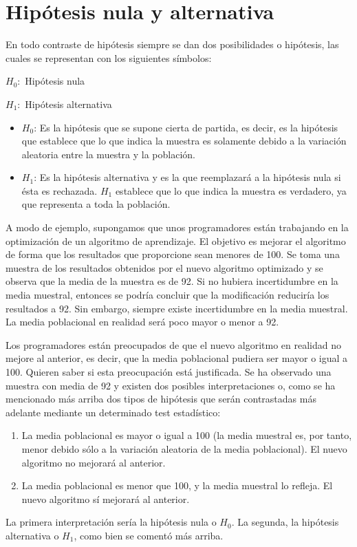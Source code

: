
\section{Hipótesis nula y alternativa}
En todo contraste de hipótesis siempre se dan dos posibilidades o hipótesis, las cuales se representan con
los siguientes símbolos:
\begin{center}
$H_0:$ Hipótesis nula

$H_1:$ Hipótesis alternativa
\end{center}
\begin{itemize}
\item $H_0$: Es la hipótesis que se supone cierta de partida, es decir, es la hipótesis que establece que lo que
indica la muestra es solamente debido a la variación aleatoria entre la muestra y la población.
\item $H_1$: Es la hipótesis alternativa y es la que reemplazará a la hipótesis nula si ésta es rechazada. $H_1$
establece que lo que indica la muestra es verdadero, ya que representa a toda la población.
\end{itemize}
A modo de ejemplo, supongamos que unos programadores están trabajando en la optimización de un algoritmo
de aprendizaje. El objetivo es mejorar el algoritmo de forma que los resultados que proporcione sean menores
de 100. Se toma una muestra de los resultados obtenidos por el nuevo algoritmo optimizado y se observa que la
media de la muestra es de 92. Si no hubiera incertidumbre en la media muestral, entonces se podría concluir
que la modificación reduciría los resultados a 92. Sin embargo, siempre existe incertidumbre en la media
muestral. La media poblacional en realidad será poco mayor o menor a 92.

Los programadores están preocupados de que el nuevo algoritmo en realidad no mejore al anterior, es decir, que
la media poblacional pudiera ser mayor o igual a 100. Quieren saber si esta preocupación está justificada. Se ha
observado una muestra con media de 92 y existen dos posibles interpretaciones o, como se ha mencionado más arriba
dos tipos de hipótesis que serán contrastadas más adelante mediante un determinado test estadístico:
\begin{enumerate}
\item La media poblacional es mayor o igual a 100 (la media muestral es, por tanto, menor debido sólo a la
variación aleatoria de la media poblacional). El nuevo algoritmo no mejorará al anterior.
\item La media poblacional es menor que 100, y la media muestral lo refleja. El nuevo algoritmo sí mejorará
al anterior.
\end{enumerate}
La primera interpretación sería la hipótesis nula o $H_0$. La segunda, la hipótesis alternativa o $H_1$, como bien
se comentó más arriba.

